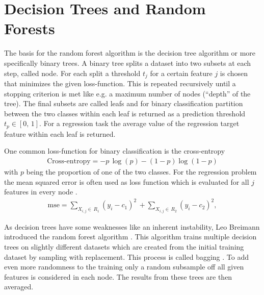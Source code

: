 \section{Decision Trees and Random Forests}
The basis for the random forest algorithm is the decision tree algorithm \cite{breiman1984classification} or more specifically binary trees.
A binary tree splits a dataset into two subsets at each step, called node.
For each split a threshold $t_j$ for a certain feature $j$ is chosen that minimizes the given loss-function.
This is repeated recursively until a stopping criterion is met like e.g. a maximum number of nodes (\enquote{depth} of the tree). 
The final subsets are called leafs and for binary classification partition between the two classes within each leaf is returned as a prediction threshold
$t_p \in [0,\, 1]$.
For a regression task the average value of the regression target feature within each leaf is returned.

One common loss-function for binary classification is the cross-entropy
\begin{align}
    \text{Cross-entropy} = - p\, \log(p) - (1 - p) \log(1-p)
\end{align}
with $p$ being the proportion of one of the two classes.
For the regression problem the mean squared error is often used as loss function which is evaluated for all $j$ features in every node \cite{hastie2009elements}.
\begin{align}
    \text{mse} = \sum_{X_{i,j} \in\, R_1} (y_i - c_1)^2\, + \sum_{X_{i,j} \in\, R_2} (y_i - c_2)^2,
\end{align}

As decision trees have some weaknesses like an inherent instability, Leo Breimann introduced the random forest algorithm \cite{breiman2001random}. 
This algorithm trains multiple decision trees on slightly different datasets which are created from the initial training dataset by sampling with replacement.
This process is called bagging \cite{breiman1996bagging}.
To add even more randomness to the training only a random subsample off all given features is considered in each node. 
The results from these trees are then averaged.


